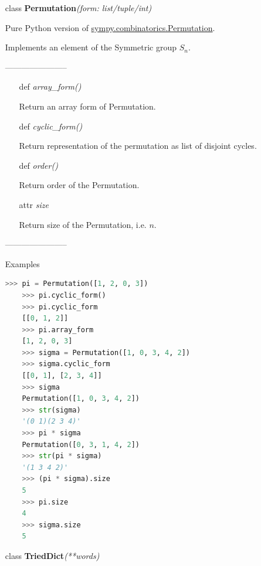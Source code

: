 \documentclass[a4paper,12pt]{amsart}
\begin{document}
\vspace{1cm}

\begin{itemize}

	\item[class] \textbf{Permutation}\textit{(form: list/tuple/int)}

	Pure Python version of \href{https://docs.sympy.org/latest/modules/combinatorics/permutations.html}{sympy.combinatorics.Permutation}. 
	
	Implements an element of the Symmetric group $S_n$. 
	
	-----------------------
	
	\vspace{0.5cm}
	\begin{itemize}
		\item[def] \textit{array\_form()}
		
		Return an array form of Permutation. 
		
		\item[def] \textit{cyclic\_form()}
		
		Return representation of the permutation as list of disjoint cycles.
		
		\item[def] \textit{order()}
		
		Return order of the Permutation.
		
		\item[attr]  \textit{size}
		
		Return size of the Permutation, i.e. $n$. 
	\end{itemize}
	
	-----------------------
	
	Examples
	
	\begin{lstlisting}[language=python]
	>>> pi = Permutation([1, 2, 0, 3])
	>>> pi.cyclic_form()
	>>> pi.cyclic_form
	[[0, 1, 2]]
	>>> pi.array_form
	[1, 2, 0, 3]
	>>> sigma = Permutation([1, 0, 3, 4, 2])
	>>> sigma.cyclic_form
	[[0, 1], [2, 3, 4]]
	>>> sigma
	Permutation([1, 0, 3, 4, 2])
	>>> str(sigma)
	'(0 1)(2 3 4)'
	>>> pi * sigma
	Permutation([0, 3, 1, 4, 2])
	>>> str(pi * sigma)
	'(1 3 4 2)'
	>>> (pi * sigma).size
	5
	>>> pi.size
	4
	>>> sigma.size
	5
	\end{lstlisting}
	
	
	\vspace{1cm}
	
	\item[class] \textbf{TriedDict}\textit{(**words)}
	

\end{itemize}
\end{document}
